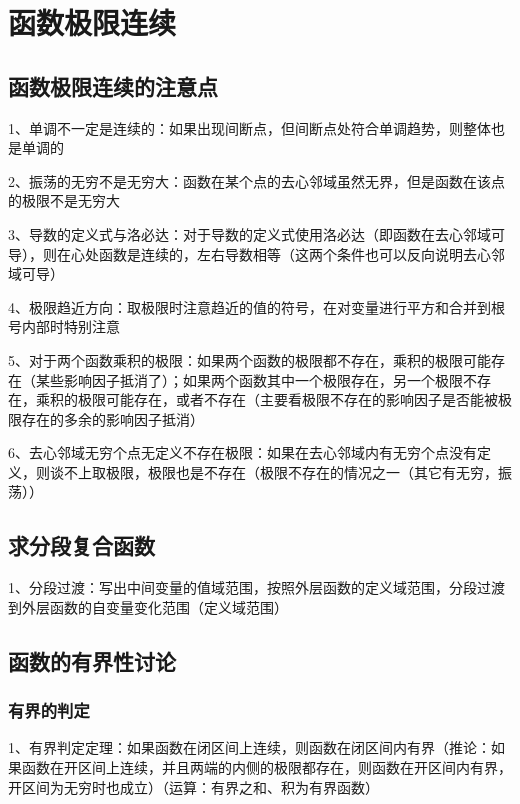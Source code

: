 \chapter{函数极限连续}

\section{函数极限连续的注意点}

1、单调不一定是连续的：如果出现间断点，但间断点处符合单调趋势，则整体也是单调的

2、振荡的无穷不是无穷大：函数在某个点的去心邻域虽然无界，但是函数在该点的极限不是无穷大

3、导数的定义式与洛必达：对于导数的定义式使用洛必达（即函数在去心邻域可导），则在心处函数是连续的，左右导数相等（这两个条件也可以反向说明去心邻域可导）

4、极限趋近方向：取极限时注意趋近的值的符号，在对变量进行平方和合并到根号内部时特别注意

5、对于两个函数乘积的极限：如果两个函数的极限都不存在，乘积的极限可能存在（某些影响因子抵消了）；如果两个函数其中一个极限存在，另一个极限不存在，乘积的极限可能存在，或者不存在（主要看极限不存在的影响因子是否能被极限存在的多余的影响因子抵消）

6、去心邻域无穷个点无定义不存在极限：如果在去心邻域内有无穷个点没有定义，则谈不上取极限，极限也是不存在（极限不存在的情况之一（其它有无穷，振荡））

\section{求分段复合函数}

1、分段过渡：写出中间变量的值域范围，按照外层函数的定义域范围，分段过渡到外层函数的自变量变化范围（定义域范围）

\section{函数的有界性讨论}



\subsection{有界的判定}

1、有界判定定理：如果函数在闭区间上连续，则函数在闭区间内有界（推论：如果函数在开区间上连续，并且两端的内侧的极限都存在，则函数在开区间内有界，开区间为无穷时也成立）（运算：有界之和、积为有界函数）

